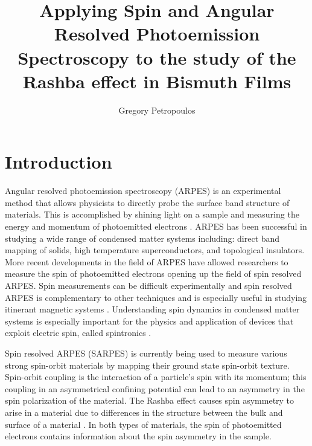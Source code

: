 \documentclass[12pt]{article}
\begin{document}
\title{Applying Spin and Angular Resolved Photoemission Spectroscopy to the study of the Rashba effect in Bismuth Films}
\author{Gregory Petropoulos}
\maketitle
{}

\section{Introduction}
Angular resolved photoemission spectroscopy (ARPES) is an experimental method that allows physicists to directly probe the surface band structure of materials.
This is accomplished by shining light on a sample and measuring the energy and momentum of photoemitted electrons \cite{Damascelli}.
ARPES has been successful in studying a wide range of condensed matter systems including:  direct band mapping of solids,  high temperature superconductors, and topological insulators.
More recent developments in the field of ARPES have allowed researchers to measure the spin of photoemitted electrons \cite{Dil, Osterwalder} opening up the field of spin resolved ARPES.
Spin measurements can be difficult experimentally and spin resolved ARPES is complementary to other techniques and is especially useful in studying itinerant magnetic systems \cite{Osterwalder}.
Understanding spin dynamics in condensed matter systems is especially important for the physics and application of devices that exploit electric spin, called spintronics \cite{wolf}.

Spin resolved ARPES (SARPES) is currently being used to measure various strong spin-orbit materials by mapping their ground state spin-orbit texture.
Spin-orbit coupling is the interaction of a particle's spin with its momentum; this coupling in an asymmetrical confining potential can lead to an asymmetry in the spin polarization of the material.
The Rashba effect causes spin asymmetry to arise in a material due to differences in the structure between the bulk and surface of a material \cite{Dil}.
In both types of materials, the spin of photoemitted electrons contains information about the spin asymmetry in the sample.
\end{document}
